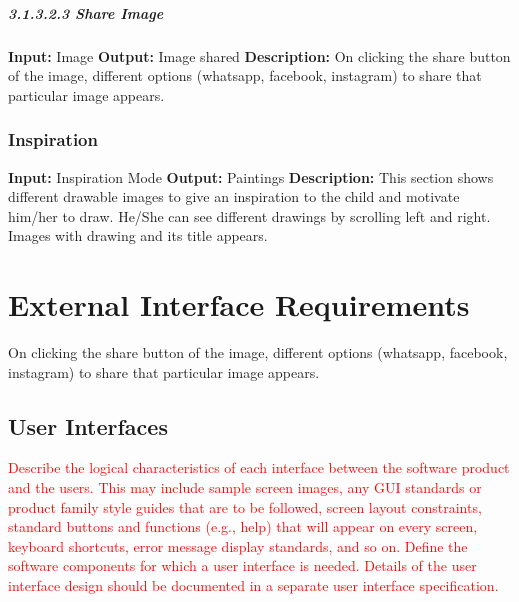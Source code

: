 \documentclass{scrreprt}
\begin{document}
\paragraph{3.1.3.2.3 Share Image}
\hfill \vspace{2.5mm} \break 
\textbf{Input:} Image \newline
\textbf{Output:} Image shared
\vspace{1mm}\newline
\textbf{Description:} \newline 
On clicking the share button of the image, different options (whatsapp, facebook, instagram) to share that particular image appears.


\subsection{Inspiration}
\textbf{Input:} Inspiration Mode \newline
\textbf{Output:} Paintings
\vspace{1mm}\newline
\textbf{Description:} \newline 
This section shows different drawable images to give an inspiration to the child and motivate him/her to draw. He/She can see different drawings by scrolling left and right. Images with drawing and its title appears.

\chapter{External Interface Requirements}
On clicking the share button of the image, different options (whatsapp, facebook, instagram) to share that particular image appears.

\section{User Interfaces}
\textcolor{red}{Describe the logical characteristics of each interface between the software product and the users. This may include sample screen images, any GUI standards or product family style guides that are to be followed, screen layout constraints, standard buttons and functions (e.g., help) that will appear on every screen, keyboard shortcuts, error message display standards, and so on.  
Define the software components for which a user interface is needed. Details of the user interface design should be documented in a separate user interface specification.}
\end{document}

